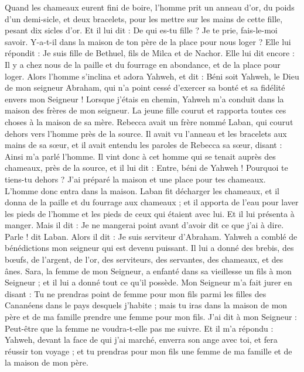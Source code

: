 \begin{multicols}{2}
Quand les chameaux eurent fini de boire, l’homme prit un anneau d'or, du poids d'un demi-sicle, et deux bracelets, pour les mettre sur les mains de cette fille, pesant dix sicles d'or.
Et il lui dit : De qui es-tu fille ? Je te prie, fais-le-moi savoir. Y-a-t-il dans la maison de ton père de la place pour nous loger ?
Elle lui répondit : Je suis fille de Bethuel, fils de Milca et de Nachor.
Elle lui dit encore : Il y a chez nous de la paille et du fourrage en abondance, et de la place pour loger.
Alors l’homme s'inclina et adora Yahweh,
et dit : Béni soit Yahweh, le Dieu de mon seigneur Abraham, qui n'a point cessé d'exercer sa bonté et sa fidélité envers mon Seigneur ! Lorsque j'étais en chemin, Yahweh m'a conduit dans la maison des frères de mon seigneur.
La jeune fille courut et rapporta toutes ces choses à la maison de sa mère.
Rebecca avait un frère nommé Laban, qui courut dehors vers l’homme près de la source.
Il avait vu l’anneau et les bracelets aux mains de sa sœur, et il avait entendu les paroles de Rebecca sa sœur, disant : Ainsi m’a parlé l’homme. Il vint donc à cet homme qui se tenait auprès des chameaux, près de la source,
et il lui dit : Entre, béni de Yahweh ! Pourquoi te tiens-tu dehors ? J'ai préparé la maison et une place pour tes chameaux.
L'homme donc entra dans la maison. Laban fit décharger les chameaux, et il donna de la paille et du fourrage  aux chameaux ; et il apporta de l'eau pour laver les pieds de l’homme et les pieds de ceux qui étaient avec lui.
Et il lui présenta à manger. Mais il dit : Je ne mangerai point avant d’avoir dit  ce que j'ai à dire. Parle ! dit Laban.
Alors il dit : Je suis serviteur d'Abraham.
Yahweh a comblé de bénédictions mon seigneur qui est devenu puissant. Il lui a donné des brebis, des bœufs, de l'argent, de l'or, des serviteurs, des servantes, des chameaux, et des ânes.
Sara, la femme de mon Seigneur, a enfanté dans sa vieillesse un fils à mon Seigneur ; et il lui a donné tout ce qu'il possède.
Mon Seigneur m'a fait jurer en disant : Tu ne prendras point de femme pour mon fils parmi les filles des Cananéens dans le pays desquels j’habite ;
mais tu iras dans la maison de mon père et de ma famille prendre une femme pour mon fils.
J’ai dit à mon Seigneur : Peut-être que la femme ne voudra-t-elle pas me suivre.
Et il m’a répondu : Yahweh, devant la face de qui j'ai marché, enverra son ange avec toi, et fera réussir ton voyage ; et tu prendras pour mon fils une femme de ma famille et de la maison de mon père.

\end{multicols}
